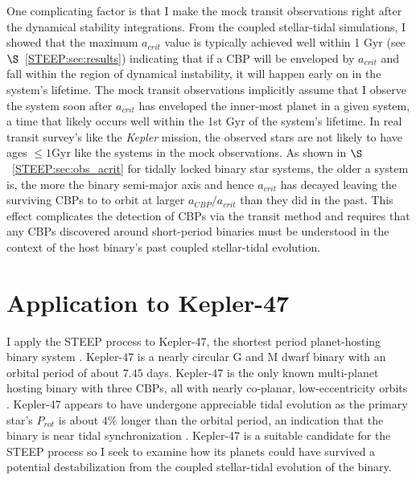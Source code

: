 One complicating factor is that I make the mock transit observations right after the dynamical stability integrations.  From the coupled stellar-tidal \vplanet simulations, I showed that the maximum $a_{crit}$ value is typically achieved well within 1 Gyr (see $\S$~\ref{STEEP:sec:results}) indicating that if a CBP will be enveloped by $a_{crit}$ and fall within the region of dynamical instability, it will happen early on in the system's lifetime.  The mock transit observations implicitly assume that I observe the system soon after $a_{crit}$ has enveloped the inner-most planet in a given system, a time that likely occurs well within the 1st Gyr of the system's lifetime.  In real transit survey's like the \textit{Kepler} mission, the observed stars are not likely to have ages $\leq 1 \text{Gyr}$ like the systems in the mock observations.  As shown in $\S$~\ref{STEEP:sec:obs_acrit} for tidally locked binary star systems, the older a system is, the more the binary semi-major axis and hence $a_{crit}$ has decayed leaving the surviving CBPs to to orbit at larger $a_{CBP}/a_{crit}$ than they did in the past.  This effect complicates the detection of CBPs via the transit method and requires that any CBPs discovered around short-period binaries must be understood in the context of the host binary's past coupled stellar-tidal evolution.


\section{Application to Kepler-47} \label{STEEP:sec:kepler47}

I apply the STEEP process to Kepler-47, the shortest period planet-hosting binary system \citep{Orosz2012}.  Kepler-47 is a nearly circular G and M dwarf binary with an orbital period of about $7.45$ days.  Kepler-47 is the only known multi-planet hosting binary with three CBPs, all with nearly co-planar, low-eccentricity orbits \citep{Orosz2012,Welsh2015}.  Kepler-47 appears to have undergone appreciable tidal evolution as the primary star's $P_{rot}$ is about $4\%$ longer than the orbital period, an indication that the binary is near tidal synchronization \citep{Orosz2012}.  Kepler-47 is a suitable candidate for the STEEP process so I seek to examine how its planets could have survived a potential destabilization from the coupled stellar-tidal evolution of the binary.  

